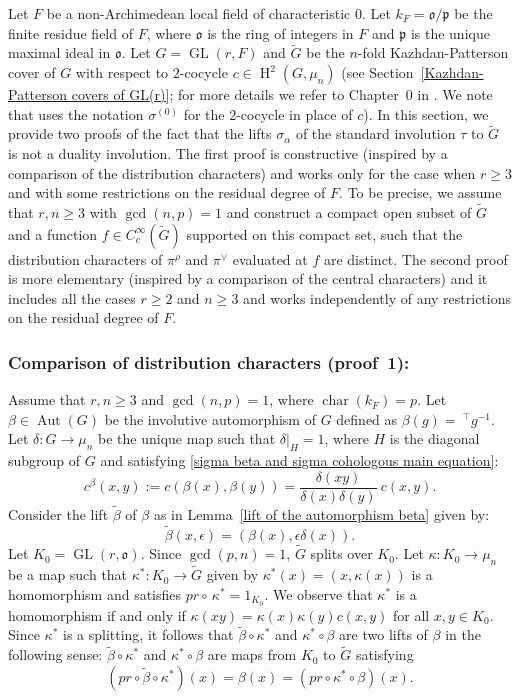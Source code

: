 \documentclass[11pt, a4paper, reqno]{amsart}
\theoremstyle{definition}
\theoremstyle{remark}
\theoremstyle{example}
\theoremstyle{note}
\numberwithin{equation}{section}
\DeclareMathOperator{\GL}{GL}
\DeclareMathOperator{\Aut}{Aut}
\DeclareMathOperator{\coh}{H}
\DeclareMathOperator{\Char}{char}
\begin{document}
Let $F$ be a non-Archimedean local field of characteristic $0$. Let $k_{F}=\mathfrak{o}/\mathfrak{p}$ be the finite residue field of $F$, where $\mathfrak{o}$ is the ring of integers in $F$ and $\mathfrak{p}$ is the unique maximal ideal in $\mathfrak{o}$. Let $G=\GL(r,F)$ and $\widetilde{G}$ be the $n$-fold Kazhdan-Patterson cover of $G$ with respect to $2$-cocycle $c\in \coh^{2}(G, \mu_{n})$ (see Section~\ref{Kazhdan-Patterson covers of GL(r)}; for more details we refer to Chapter~$0$ in \cite{KazPat[2]}. We note that \cite{KazPat[2]} uses the notation $\sigma^{(0)}$ for the $2$-cocycle in place of $c$). In this section, we provide two proofs of the fact that the lifts $\sigma_\alpha$ of the standard involution $\tau$ to $\widetilde{G}$ is not a duality involution. The first proof is constructive (inspired by a comparison of the distribution characters) and works only for the case when $r\geq 3$ and with some restrictions on the residual degree of $F$. To be precise, we assume that $r,n\geq 3$ with $\gcd(n,p)=1$ and construct a compact open subset of $\widetilde{G}$ and a function $f\in C_{c}^{\infty}(\widetilde{G})$ supported on this compact set, such that the distribution characters of $\pi^{\rho}$ and $\pi^{\vee}$  evaluated at $f$ are distinct. The second proof is more elementary (inspired by a comparison of the central characters) and it includes all the cases $r\geq 2$ and $n\geq 3$ and works independently of any restrictions on the residual degree of $F$. 

\subsubsection{Comparison of distribution characters (proof~1):} Assume that $r,n \geq 3$ and $\gcd (n,p)=1$, where $\Char(k_{F})=p$. Let $\beta\in \Aut(G)$ be the involutive automorphism of $G$ defined as $\beta(g)=~^{\top}g^{-1}.$ Let $\delta:G\rightarrow \mu_{n}$ be the unique map such that $\delta|_H=1$, where $H$ is the diagonal subgroup of $G$ and satisfying \eqref{sigma beta and sigma cohologous main equation}: 
\[c^\beta(x,y):= c(\beta(x),\beta(y))= \frac{\delta(xy)}{\delta(x) \delta(y)} \ c(x,y).\] 
Consider the lift $\tilde{\beta}$ of $\beta$ as in Lemma~\ref{lift of the automorphism beta} given by: 
\begin{equation*} \tilde{\beta}(x,\epsilon)= (\beta(x), \epsilon\delta(x)).
\end{equation*}
Let $K_{0}=\GL(r,\mathfrak{o})$. Since $\gcd (p,n)=1$, $\widetilde{G}$ splits over $K_0.$ Let $\kappa:K_0 \to \mu_n$ be a map such that $\kappa^*:K_0 \to \widetilde{G}$ given by $\kappa^*(x)=(x, \kappa(x))$ is a homomorphism and satisfies $pr\circ\, \kappa^*= 1_{K_0}$.
We observe that
$\kappa^*$ is a homomorphism if and only if $\kappa(xy)=\kappa(x)\kappa(y)c(x,y)$ for all $x,y \in K_0.$ Since $\kappa^*$ is a splitting, it follows that $\tilde{\beta} \circ \kappa^*$ and $\kappa^* \circ \beta$ are two lifts of $\beta$ in the following sense: $\tilde{\beta} \circ \kappa^*$ and $\kappa^* \circ \beta$ are maps from $K_0$ to $\widetilde{G}$ satisfying
\[ (pr \circ \tilde{\beta} \circ \kappa^*)(x) = \beta(x)= (pr \circ \kappa^* \circ \beta)(x).\]
\end{document}
